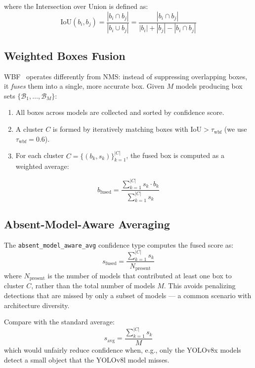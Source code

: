 \documentclass[11pt,a4paper]{article}
\begin{document}
where the Intersection over Union is defined as:
\begin{equation}
    \text{IoU}(b_i, b_j) = \frac{|b_i \cap b_j|}{|b_i \cup b_j|} = \frac{|b_i \cap b_j|}{|b_i| + |b_j| - |b_i \cap b_j|}
    \label{eq:iou}
\end{equation}

\subsection{Weighted Boxes Fusion}

WBF~\citep{solovyev2021wbf} operates differently from NMS: instead of suppressing overlapping boxes, it \emph{fuses} them into a single, more accurate box.
Given $M$ models producing box sets $\{\mathcal{B}_1, \ldots, \mathcal{B}_M\}$:

\begin{enumerate}    \item All boxes across models are collected and sorted by confidence score.
    \item A cluster $C$ is formed by iteratively matching boxes with $\text{IoU} > \tau_{\text{wbf}}$ (we use $\tau_{\text{wbf}} = 0.6$).
    \item For each cluster $C = \{(b_k, s_k)\}_{k=1}^{|C|}$, the fused box is computed as a weighted average:
\end{enumerate}
\begin{equation}
    b_{\text{fused}} = \frac{\sum_{k=1}^{|C|} s_k \cdot b_k}{\sum_{k=1}^{|C|} s_k}
    \label{eq:wbf_box}
\end{equation}

\subsection{Absent-Model-Aware Averaging}

The \texttt{absent\_model\_aware\_avg} confidence type computes the fused score as:
\begin{equation}
    s_{\text{fused}} = \frac{\sum_{k=1}^{|C|} s_k}{N_{\text{present}}}
    \label{eq:absent_aware}
\end{equation}
where $N_{\text{present}}$ is the number of models that contributed at least one box to cluster $C$, rather than the total number of models $M$.
This avoids penalizing detections that are missed by only a subset of models --- a common scenario with architecture diversity.

Compare with the standard average:
\begin{equation}
    s_{\text{avg}} = \frac{\sum_{k=1}^{|C|} s_k}{M}
    \label{eq:standard_avg}
\end{equation}
which would unfairly reduce confidence when, e.g., only the YOLOv8x models detect a small object that the YOLOv8l model misses.
\end{document}
